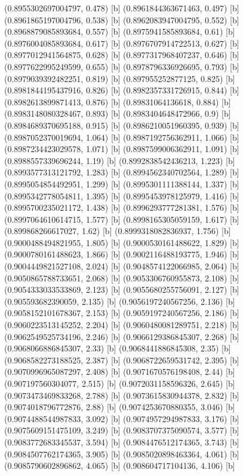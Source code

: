 {{{(0.8955302697004797, 0.478) [b] 
(0.8961844363671463, 0.497) [b] 
(0.8961865197004796, 0.538) [b] 
(0.8962083947004795, 0.552) [b] 
(0.8968879085893684, 0.557) [b] 
(0.8975941585893684, 0.61) [b] 
(0.8976004085893684, 0.617) [b] 
(0.8976707914722513, 0.627) [b] 
(0.8977012941564875, 0.628) [b] 
(0.8977317968407237, 0.646) [b] 
(0.8977622995249599, 0.655) [b] 
(0.8978796336926695, 0.793) [b] 
(0.8979039392482251, 0.819) [b] 
(0.897955252877125, 0.825) [b] 
(0.8981844195437916, 0.826) [b] 
(0.8982357331726915, 0.844) [b] 
(0.8982613899871413, 0.876) [b] 
(0.89831064136618, 0.884) [b] 
(0.8983148080328467, 0.893) [b] 
(0.8983404648472966, 0.9) [b] 
(0.8984689370695188, 0.915) [b] 
(0.8986210051960395, 0.939) [b] 
(0.8987052370019694, 1.064) [b] 
(0.8987192756362911, 1.066) [b] 
(0.8987234423029578, 1.071) [b] 
(0.8987599006362911, 1.091) [b] 
(0.8988557339696244, 1.19) [b] 
(0.8992838542436213, 1.223) [b] 
(0.8993577313121792, 1.283) [b] 
(0.8994562340702564, 1.289) [b] 
(0.8995054854492951, 1.299) [b] 
(0.8995301111388144, 1.337) [b] 
(0.8995342778054811, 1.395) [b] 
(0.8995453978125979, 1.416) [b] 
(0.8995700235021172, 1.438) [b] 
(0.8996293777281381, 1.576) [b] 
(0.8997064610614715, 1.577) [b] 
(0.8998165305059159, 1.617) [b] 
(0.899868266617027, 1.62) [b] 
(0.8999318082836937, 1.756) [b] 
(0.9000488494821955, 1.805) [b] 
(0.9000530161488622, 1.829) [b] 
(0.9000780161488623, 1.866) [b] 
(0.9002116488193775, 1.946) [b] 
(0.9004449821527108, 2.024) [b] 
(0.9048574122066985, 2.064) [b] 
(0.9050865788733651, 2.068) [b] 
(0.9053306760955873, 2.108) [b] 
(0.9054333033533869, 2.123) [b] 
(0.9055680255756091, 2.127) [b] 
(0.905593682390059, 2.135) [b] 
(0.9056197240567256, 2.136) [b] 
(0.9058152101678367, 2.153) [b] 
(0.9059197240567256, 2.186) [b] 
(0.9060223513145252, 2.204) [b] 
(0.9060480081289751, 2.218) [b] 
(0.9062549525734196, 2.246) [b] 
(0.9066129386845307, 2.268) [b] 
(0.9068066886845307, 2.33) [b] 
(0.9068441886845308, 2.35) [b] 
(0.9068582273188525, 2.387) [b] 
(0.9068722659531742, 2.395) [b] 
(0.9070996965087297, 2.408) [b] 
(0.9071670576198408, 2.44) [b] 
(0.907197560304077, 2.515) [b] 
(0.9072031158596326, 2.645) [b] 
(0.9073473469833268, 2.788) [b] 
(0.9073615830944378, 2.832) [b] 
(0.9074018796772876, 2.88) [b] 
(0.9074253670880355, 3.046) [b] 
(0.9074488544987833, 3.092) [b] 
(0.9074957294987833, 3.176) [b] 
(0.9075609151475109, 3.249) [b] 
(0.9083707375090574, 3.577) [b] 
(0.9083772683345537, 3.594) [b] 
(0.9084476512174365, 3.743) [b] 
(0.9084507762174365, 3.905) [b] 
(0.9085020898463364, 4.061) [b] 
(0.9085790602896862, 4.065) [b] 
(0.908604717104136, 4.106) [b] 
}}}

